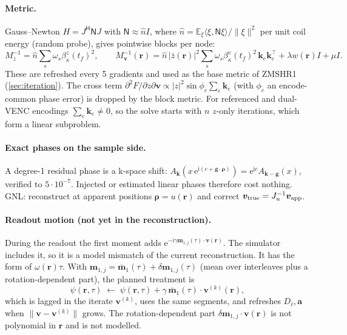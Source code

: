 \documentclass[11pt]{article}
\theoremstyle{remark}
\newcommand{\rr}{\bm r}
\newcommand{\kk}{\bm k}
\newcommand{\ii}{\mathrm i}
\newcommand{\ee}{\mathrm e}
\newcommand{\Nop}{\mathsf N}
\newcommand{\herm}{\mathsf H}
\begin{document}
\paragraph{Metric.} Gauss--Newton $H=J^\herm\Nop J$ with $\Nop\approx\hat n I$, where $\hat n=\mathbb E_\xi\langle\xi,\Nop\xi\rangle/\|\xi\|^2$ per unit coil energy (random probe), gives pointwise blocks per node:
\begin{equation}
  M_z^{-1}=\hat n\sum_s\omega_s\beta^z_\kappa(t_f)^2,\qquad
  M_{\bm v}^{-1}(\rr)=\hat n\,|\bar z(\rr)|^2\sum_s\omega_s\beta^v_\kappa(t_f)^2\,\bm k_e\bm k_e^{\!\top}+\lambda w(\rr)I+\mu I .
\end{equation}
These are refreshed every 5 gradients and used as the base metric of ZMSHR1 (\cref{sec:iteration}).
The cross term $\partial^2F/\partial z\partial\bm v\propto|z|^2\sin\phi_c\sum_e\bm k_e$ (with $\phi_c$ an encode-common phase error) is dropped by the block metric. For referenced and dual-VENC encodings $\sum_e\bm k_e\neq0$, so the solve starts with $n$ $z$-only iterations, which form a linear subproblem.

\paragraph{Exact phases on the sample side.} A degree-1 residual phase is a k-space shift: $A_{\kk}(x\,\ee^{\ii(c+\bm g\cdot\bm\rho)})=\ee^{\ii c}A_{\kk-\bm g}(x)$, verified to $5\cdot10^{-7}$. Injected or estimated linear phases therefore cost nothing.
GNL: reconstruct at apparent positions $\bm\rho=u(\rr)$ and correct $\bm v_{\rm true}=J_u^{-1}\bm v_{\rm app}$.

\paragraph{Readout motion (not yet in the reconstruction).} During the readout the first moment adds $\ee^{-\ii\gamma\bm m_{1,j}(\tau)\cdot\bm v(\rr)}$. The simulator includes it, so it is a model mismatch of the current reconstruction.
It has the form of $\omega(\rr)\tau$. With $\bm m_{1,j}=\bar{\bm m}_1(\tau)+\delta\bm m_{1,j}(\tau)$ (mean over interleaves plus a rotation-dependent part), the planned treatment is
\begin{equation}
  \psi(\rr,\tau)\;\leftarrow\;\psi(\rr,\tau)+\gamma\,\bar{\bm m}_1(\tau)\cdot\bm v^{(k)}(\rr),
\end{equation}
which is lagged in the iterate $\bm v^{(k)}$, uses the same segments, and refreshes $D_\ell,\bm a$ when $\|\bm v-\bm v^{(k)}\|$ grows. The rotation-dependent part $\delta\bm m_{1,j}\cdot\bm v(\rr)$ is not polynomial in $\rr$ and is not modelled.
\end{document}
